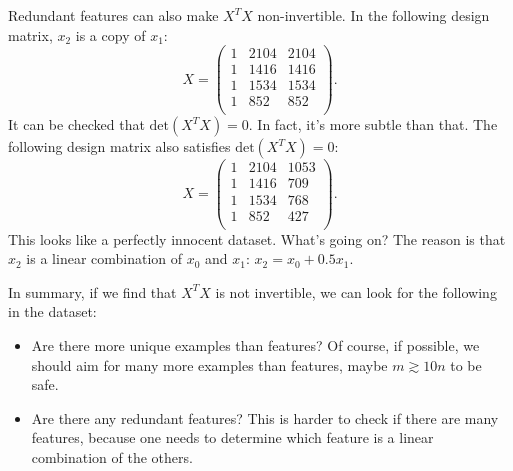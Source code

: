 \documentclass{article}
\theoremstyle{definition}
\begin{document}
Redundant features can also make $X^TX$ non-invertible. In the following design matrix, $x_2$ is a copy of $x_1$:
\begin{equation}
        X =
    \begin{pmatrix}
        1 & 2104 & 2104 \\
        1 & 1416 & 1416 \\
        1 & 1534 & 1534 \\
        1 & 852 & 852 \\
    \end{pmatrix}.
\end{equation}
It can be checked that $\text{det}(X^TX)=0$. In fact, it's more subtle than that. The following design matrix also satisfies $\text{det}(X^TX)=0$:
\begin{equation}
        X =
    \begin{pmatrix}
        1 & 2104 & 1053 \\
        1 & 1416 & 709 \\
        1 & 1534 & 768 \\
        1 & 852 & 427 \\
    \end{pmatrix}.
\end{equation}
This looks like a perfectly innocent dataset. What's going on?
The reason is that $x_2$ is a linear combination of $x_0$ and $x_1$: $x_2 = x_0 + 0.5 x_1$.

In summary, if we find that $X^TX$ is not invertible, we can look for the following in the dataset:
\begin{itemize}
    \item Are there more unique examples than features? Of course, if possible, we should aim for many more examples than features, maybe $m\gtrsim 10n$ to be safe.
    \item Are there any redundant features? This is harder to check if there are many features, because one needs to determine which feature is a linear combination of the others.
\end{itemize}


\end{document}

